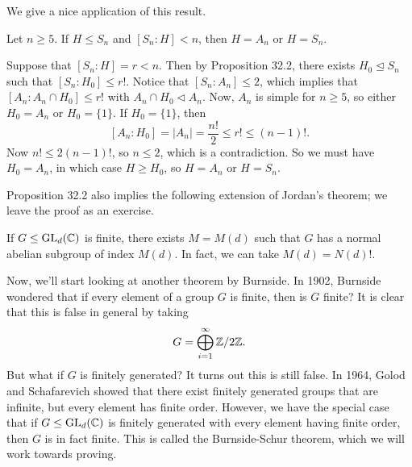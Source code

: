 We give a nice application of this result. 

\begin{exmp}{}
    Let $n \geq 5$. If $H \leq S_n$ and $[S_n : H] < n$, then $H = A_n$ or 
    $H = S_n$. 
\end{exmp}
\begin{pf}
    Suppose that $[S_n : H] = r < n$. Then by Proposition 32.2, there exists 
    $H_0 \trianglelefteq S_n$ such that $[S_n : H_0] \leq r!$. Notice that 
    $[S_n : A_n] \leq 2$, which implies that $[A_n : A_n \cap H_0] \leq r!$ 
    with $A_n \cap H_0 \triangleleft A_n$. Now, $A_n$ is simple for 
    $n \geq 5$, so either $H_0 = A_n$ or $H_0 = \{1\}$. If $H_0 = \{1\}$, then 
    \[ [A_n : H_0] = |A_n| = \frac{n!}2 \leq r! \leq (n-1)!. \] 
    Now $n! \leq 2(n-1)!$, so $n \leq 2$, which is a contradiction. So we must 
    have $H_0 = A_n$, in which case $H \geq H_0$, so $H = A_n$ or $H = S_n$. 
\end{pf}

Proposition 32.2 also implies the following extension of Jordan's theorem; 
we leave the proof as an exercise. 

\begin{theo}{}
    If $G \leq \operatorname{GL}_d(\mathbb{C})$ is finite, there exists $M = M(d)$ such that 
    $G$ has a normal abelian subgroup of index $M(d)$. In fact, we can 
    take $M(d) = N(d)!$. 
\end{theo}

Now, we'll start looking at another theorem by Burnside. In 1902, Burnside 
wondered that if every element of a group $G$ is finite, then is $G$ finite? 
It is clear that this is false in general by taking 
\[ G = \bigoplus_{i=1}^\infty \mathbb{Z}/2\mathbb{Z}. \] 
But what if $G$ is finitely generated? It turns out this is still false. 
In 1964, Golod and Schafarevich showed that there exist finitely generated 
groups that are infinite, but every element has finite order. However, 
we have the special case that if $G \leq \operatorname{GL}_d(\mathbb{C})$ is finitely generated 
with every element having finite order, then $G$ is in fact finite. This is 
called the Burnside-Schur theorem, which we will work towards proving. 

